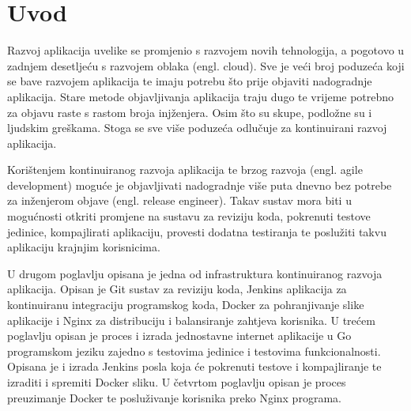 \chapter{Uvod}
Razvoj aplikacija uvelike se promjenio s razvojem novih tehnologija, a pogotovo u zadnjem desetljeću
s razvojem oblaka (engl. cloud). Sve je veći broj poduzeća koji se bave razvojem aplikacija te imaju
potrebu što prije objaviti nadogradnje aplikacija. Stare metode objavljivanja aplikacija traju
dugo te vrijeme potrebno za objavu raste s rastom broja injženjera. Osim što su skupe, podložne su i
ljudskim greškama.  Stoga se sve više poduzeća odlučuje za kontinuirani razvoj aplikacija.

Korištenjem kontinuiranog razvoja aplikacija te brzog razvoja (engl. agile development) moguće je
objavljivati nadogradnje više puta dnevno bez potrebe za inženjerom objave (engl. release engineer).
Takav sustav mora biti u mogućnosti otkriti promjene na sustavu za reviziju koda, pokrenuti
testove jedinice, kompajlirati aplikaciju, provesti dodatna testiranja te poslužiti takvu aplikaciju
krajnjim korisnicima.

U drugom poglavlju opisana je jedna od infrastruktura kontinuiranog razvoja aplikacija. Opisan je
Git sustav za reviziju koda, Jenkins aplikacija za kontinuiranu integraciju programskog koda,
Docker za pohranjivanje slike aplikacije i Nginx za distribuciju i balansiranje zahtjeva korisnika.
U trećem poglavlju opisan je proces i izrada jednostavne internet aplikacije u Go programskom jeziku
zajedno s testovima jedinice i testovima funkcionalnosti. Opisana je i izrada Jenkins posla koja će
pokrenuti testove i kompajliranje te izraditi i spremiti Docker sliku. U četvrtom poglavlju opisan
je proces preuzimanje Docker te posluživanje korisnika preko Nginx programa.

